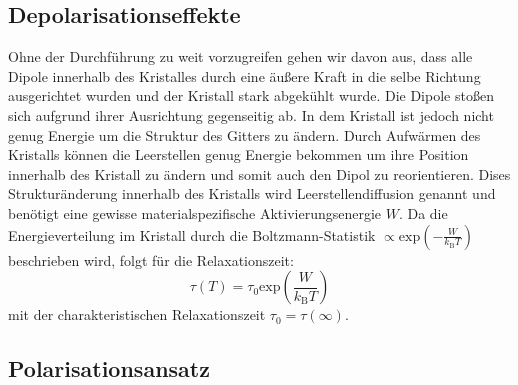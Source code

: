 	\subsection{Depolarisationseffekte}
		
		Ohne der Durchführung zu weit vorzugreifen gehen wir davon aus, dass alle Dipole innerhalb des Kristalles durch eine äußere Kraft in die selbe Richtung ausgerichtet wurden und der Kristall stark abgekühlt wurde.
		Die Dipole stoßen sich aufgrund ihrer Ausrichtung gegenseitig ab. In dem Kristall ist jedoch nicht genug Energie um die Struktur des Gitters zu ändern.
		Durch Aufwärmen des Kristalls können die Leerstellen genug Energie bekommen um ihre Position innerhalb des Kristall zu ändern und somit auch den Dipol zu reorientieren.
		Dises Strukturänderung innerhalb des Kristalls wird Leerstellendiffusion genannt und benötigt eine gewisse materialspezifische Aktivierungsenergie $W$.
		Da die Energieverteilung im Kristall durch die Boltzmann-Statistik $\propto\text{exp}\left(-\frac{W}{k_\text{B}T}\right)$ beschrieben wird, folgt für die Relaxationszeit:\\
		\begin{equation}
			\tau(T) = \tau_0 \text{exp}\left(\frac{W}{k_\text{B}T}\right)
			\label{eqn:tau0}
		\end{equation}
		mit der charakteristischen Relaxationszeit $\tau_0 = \tau(\infty)$.

	\subsection{Polarisationsansatz}

